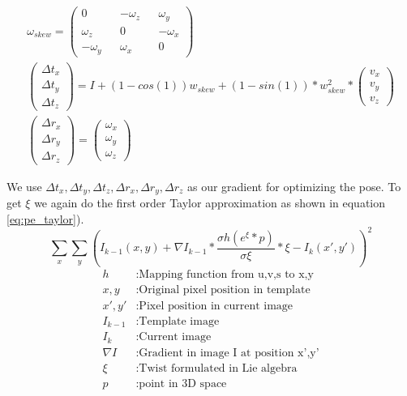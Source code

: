 \documentclass[11pt,a4paper,titlepage,oneside]{report}
\begin{document}
\begin{equation}\label{eq:pe_closed_form}
  \begin{gathered}
    \omega_{skew}=\begin{pmatrix}
      0 && -\omega_z && \omega_y \\
      \omega_z && 0 && -\omega_x \\
      -\omega_y && \omega_x && 0
    \end{pmatrix}\\
    \begin{pmatrix}
      \Delta t_x\\
      \Delta t_y\\
      \Delta t_z
    \end{pmatrix}=
    I+(1-cos(1))w_{skew}+(1-sin(1))*w_{skew}^2*\begin{pmatrix}
      v_x\\
      v_y\\
      v_z
    \end{pmatrix}\\
    \begin{pmatrix}
      \Delta r_x\\
      \Delta r_y\\
      \Delta r_z
    \end{pmatrix}=
    \begin{pmatrix}
      \omega_x\\
      \omega_y\\
      \omega_z
    \end{pmatrix}
  \end{gathered}
\end{equation}

We use $\Delta t_x,\Delta t_y,\Delta t_z,\Delta r_x,\Delta r_y,\Delta r_z$ as our gradient for optimizing the pose. To get $\xi$ we again do the first order Taylor approximation as shown in equation \ref{eq:pe_taylor}).
\begin{equation}\label{eq:pe_taylor}
  \sum_x\sum_y(I_{k-1}(x,y)+\nabla I_{k-1}*\frac{\sigma h(e^{\xi}*p)}{\sigma \xi}*\xi-I_{k}(x',y'))^2
\end{equation}
\begin{align*}
  h      			&:  \text{Mapping function from u,v,s to x,y}\\
  x,y        	&: \text{Original pixel position in template}\\
  x',y'      	&: \text{Pixel position in current image}\\
  I_{k-1}    	&: \text{Template image}\\
  I_{k}      	&: \text{Current image}\\
  \nabla I  	&: \text{Gradient in image I at position x',y'}\\
  \xi        	&: \text{Twist formulated in Lie algebra}\\
  p          	&: \text{point in 3D space}  
\end{align*}
\end{document}
